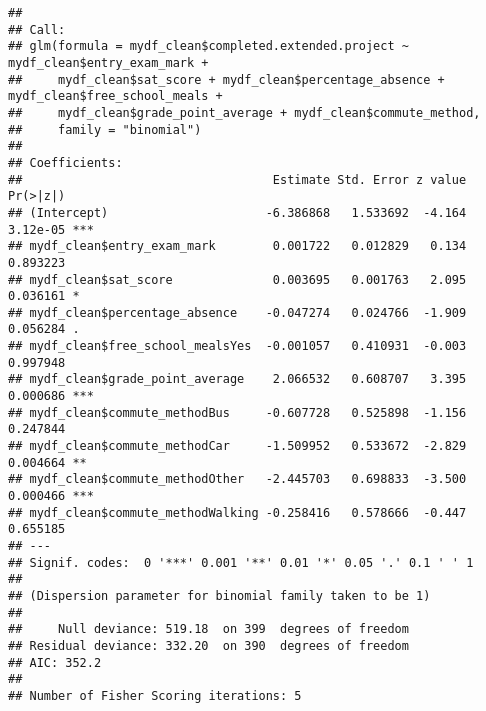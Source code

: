 \documentclass[
]{article}
\newenvironment{Shaded}{\begin{snugshade}}{\end{snugshade}}
\newcommand{\AttributeTok}[1]{\textcolor[rgb]{0.13,0.29,0.53}{#1}}
\newcommand{\FunctionTok}[1]{\textcolor[rgb]{0.13,0.29,0.53}{\textbf{#1}}}
\newcommand{\NormalTok}[1]{#1}
\newcommand{\OtherTok}[1]{\textcolor[rgb]{0.56,0.35,0.01}{#1}}
\newcommand{\SpecialCharTok}[1]{\textcolor[rgb]{0.81,0.36,0.00}{\textbf{#1}}}
\newcommand{\StringTok}[1]{\textcolor[rgb]{0.31,0.60,0.02}{#1}}
\begin{document}
\begin{Shaded}
\end{Shaded}

\begin{verbatim}
## 
## Call:
## glm(formula = mydf_clean$completed.extended.project ~ mydf_clean$entry_exam_mark + 
##     mydf_clean$sat_score + mydf_clean$percentage_absence + mydf_clean$free_school_meals + 
##     mydf_clean$grade_point_average + mydf_clean$commute_method, 
##     family = "binomial")
## 
## Coefficients:
##                                   Estimate Std. Error z value Pr(>|z|)    
## (Intercept)                      -6.386868   1.533692  -4.164 3.12e-05 ***
## mydf_clean$entry_exam_mark        0.001722   0.012829   0.134 0.893223    
## mydf_clean$sat_score              0.003695   0.001763   2.095 0.036161 *  
## mydf_clean$percentage_absence    -0.047274   0.024766  -1.909 0.056284 .  
## mydf_clean$free_school_mealsYes  -0.001057   0.410931  -0.003 0.997948    
## mydf_clean$grade_point_average    2.066532   0.608707   3.395 0.000686 ***
## mydf_clean$commute_methodBus     -0.607728   0.525898  -1.156 0.247844    
## mydf_clean$commute_methodCar     -1.509952   0.533672  -2.829 0.004664 ** 
## mydf_clean$commute_methodOther   -2.445703   0.698833  -3.500 0.000466 ***
## mydf_clean$commute_methodWalking -0.258416   0.578666  -0.447 0.655185    
## ---
## Signif. codes:  0 '***' 0.001 '**' 0.01 '*' 0.05 '.' 0.1 ' ' 1
## 
## (Dispersion parameter for binomial family taken to be 1)
## 
##     Null deviance: 519.18  on 399  degrees of freedom
## Residual deviance: 332.20  on 390  degrees of freedom
## AIC: 352.2
## 
## Number of Fisher Scoring iterations: 5
\end{verbatim}
\end{document}
